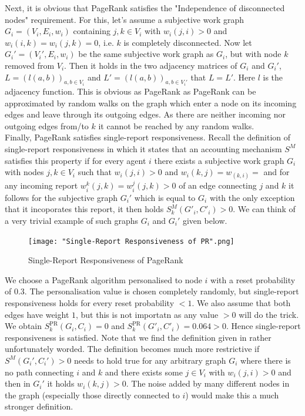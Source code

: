 \documentclass[11pt,a4paper]{article}
\theoremstyle{definition}
\theoremstyle{theorem}
\theoremstyle{proposition}
\theoremstyle{corollary}
\theoremstyle{lemma}
\theoremstyle{example}
\theoremstyle{remark}
\begin{document}
\noindent{}Next, it is obvious that PageRank satisfies the "Independence of disconnected nodes" requirement. For this, let's assume a subjective work graph $G_i=(V_i,E_i,w_i)$ containing $j,k\in{}V_i$ with $w_i(j,i)>0$ and $w_i(i,k)=w_i(j,k)=0$, i.e. $k$ is completely disconnected. Now let $G_i'=(V_i',E_i,w_i)$ be the same subjective work graph as $G_i$, but with node $k$ removed from $V_i$. Then it holds in the two adjacency matrices of $G_i$ and $G_i'$, $L=(l(a,b))_{a,b\in{}V_i}$ and $L'=(l(a,b))_{a,b\in{}V_i'}$ that $L=L'$. Here $l$ is the adjacency function. This is obvious as PageRank as PageRank can be approximated by random walks on the graph which enter a node on its incoming edges and leave through its outgoing edges. As there are neither incoming nor outgoing edges from/to $k$ it cannot be reached by any random walks. \vspace{1em}\\

\noindent{}Finally, PageRank satisfies single-report responsiveness. Recall the definition of single-report responsiveness in which it states that an accounting mechanism $S^M$ satisfies this property if for every agent $i$ there exists a subjective work graph $G_i$ with nodes $j,k\in{}V_i$ such that $w_i(j,i)>0$ and $w_i(k,j)=w_(k,i)=$ and for any incoming report $w_i^k(j,k)=w_i^j(j,k)>0$ of an edge connecting $j$ and $k$ it follows for the subjective graph $G_i'$ which is equal to $G_i$ with the only exception that it incoporates this report, it then holds $S^M_k(G'_i,C'_i)>0$. We can think of a very trivial example of such graphs $G_i$ and $G_i'$ given below.\vspace{1em}\\

\begin{figure}[H]
\begin{center}
\texttt{[image: "Single-Report Responsiveness of PR".png]}
\caption{Single-Report Responsiveness of PageRank}
\label{fig:Single-Report Reponsiveness of PageRank}
\end{center}
\end{figure}

\noindent{}We choose a PageRank algorithm personalised to node $i$ with a reset probability of $0.3$. The personalisation value is chosen completely randomly, but single-report responsiveness holds for every reset probability $<1$. We also assume that both edges have weight $1$, but this is not importatn as any value $>0$ will do the trick. We obtain $S^{\text{PR}}_k(G_i,C_i)=0$ and $S^{\text{PR}}_k(G'_i,C'_i)=0.064>0$. Hence single-report responsiveness is satisfied. Note that we find the definition given in \cite{On the Sybil-Proofness of Accounting Mechanisms} rather unfortunately worded. The definition becomes much more restrictive if $S^M(G_i',C_i')>0$ needs to hold true for any arbitrary graph $G_i$ where there is no path connecting $i$ and $k$ and there exists some $j\in{}V_i$ with $w_i(j,i)>0$ and then in $G_i'$ it holds $w_i(k,j)>0$. The noise added by many different nodes in the graph (especially those directly connected to $i$) would make this a much stronger definition. \vspace{1em}\\
\end{document}
